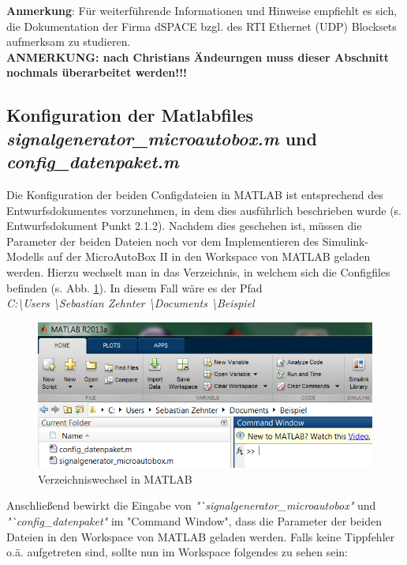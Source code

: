 \documentclass[fontsize = 12pt, paper = a4]{scrreprt}
\begin{document}
\textbf{Anmerkung}: Für weiterführende Informationen und Hinweise empfiehlt es sich, die Dokumentation der Firma dSPACE bzgl. des RTI Ethernet (UDP) Blocksets aufmerksam zu studieren. \\

\textbf{ANMERKUNG: nach Christians Ändeurngen muss dieser Abschnitt nochmals überarbeitet werden!!!}



\newpage





\subsection{Konfiguration der Matlabfiles \textit{signalgenerator\_microautobox.m} und \textit{config\_datenpaket.m}}

Die Konfiguration der beiden Configdateien in MATLAB ist entsprechend des Entwurfsdokumentes vorzunehmen, in dem dies ausführlich beschrieben wurde (s. Entwurfsdokument Punkt 2.1.2). Nachdem dies geschehen ist, müssen die Parameter der beiden Dateien noch vor dem Implementieren des Simulink-Modells auf der MicroAutoBox II in den Workspace von MATLAB geladen werden. Hierzu wechselt man in das Verzeichnis, in welchem sich die Configfiles befinden (s. Abb. \ref{configfilespfad}). In diesem Fall wäre es der Pfad \\ \textit{C:\textbackslash Users \textbackslash Sebastian Zehnter \textbackslash Documents \textbackslash Beispiel}

\begin{figure}[h]
\centering
\includegraphics[scale = 0.65]{configfilespfad}
\caption[Verzeichniswechsel in MATLAB]{Verzeichniswechsel in MATLAB}
\label{configfilespfad}
\end{figure} 

Anschließend bewirkt die Eingabe von \textit{"`signalgenerator\_microautobox"} und \textit{"`config\_datenpaket"} im "Command Window", dass die Parameter der beiden Dateien in den Workspace von MATLAB geladen werden. Falls keine Tippfehler o.ä. aufgetreten sind, sollte nun im Workspace folgendes zu sehen sein: 
\end{document}
